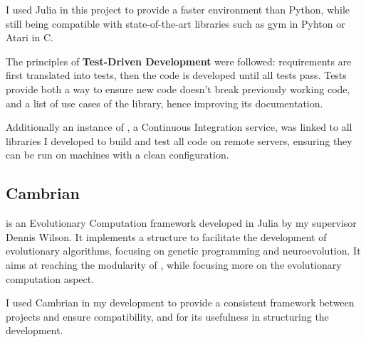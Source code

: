 I used Julia in this project to provide a faster environment than Python, while still being compatible with state-of-the-art libraries such as gym in Pyhton or Atari in C.

The principles of \textbf{Test-Driven Development} were followed: requirements are first translated into tests, then the code is developed until all tests pass. Tests provide both a way to ensure new code doesn't break previously working code, and a list of use cases of the library, hence improving its documentation.

Additionally an instance of ,  a Continuous Integration service, was linked to all libraries I developed to build and test all code on remote servers, ensuring they can be run on machines with a clean configuration. 

\subsection{Cambrian}

 is an Evolutionary Computation framework developed in Julia by my supervisor Dennis Wilson. It implements a structure to facilitate the development of evolutionary algorithms, focusing on genetic programming and neuroevolution. It aims at reaching the modularity of , while focusing more on the evolutionary computation aspect. 

I used Cambrian in my development to provide a consistent framework between projects and ensure compatibility, and for its usefulness in structuring the development.

